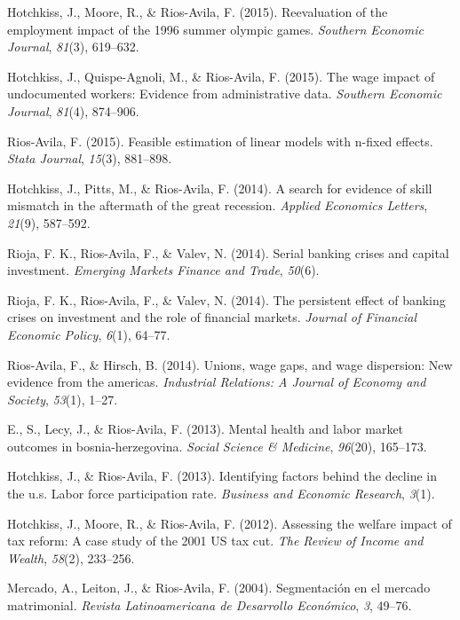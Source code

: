 \documentclass[
  letterpaper,
]{moderncv}
\newlength{\cslhangindent}
\newenvironment{CSLReferences}[2] %
 {\begin{list}{}{%
  \setlength{\itemindent}{0pt}
  \setlength{\leftmargin}{0pt}
  \setlength{\parsep}{0pt}
  \ifodd #1
   \setlength{\leftmargin}{\cslhangindent}
   \setlength{\itemindent}{-1\cslhangindent}
  \fi
  \setlength{\itemsep}{#2\baselineskip}}}
 {\end{list}}
\begin{document}
\begin{CSLReferences}{1}{0}
Hotchkiss, J., Moore, R., \& Rios-Avila, F. (2015). Reevaluation of the
employment impact of the 1996 summer olympic games. \emph{Southern
Economic Journal}, \emph{81}(3), 619--632.

Hotchkiss, J., Quispe-Agnoli, M., \& Rios-Avila, F. (2015). The wage
impact of undocumented workers: Evidence from administrative data.
\emph{Southern Economic Journal}, \emph{81}(4), 874--906.

Rios-Avila, F. (2015). Feasible estimation of linear models with n-fixed
effects. \emph{Stata Journal}, \emph{15}(3), 881--898.

Hotchkiss, J., Pitts, M., \& Rios-Avila, F. (2014). A search for
evidence of skill mismatch in the aftermath of the great recession.
\emph{Applied Economics Letters}, \emph{21}(9), 587--592.

Rioja, F. K., Rios-Avila, F., \& Valev, N. (2014). Serial banking crises
and capital investment. \emph{Emerging Markets Finance and Trade},
\emph{50}(6).

Rioja, F. K., Rios-Avila, F., \& Valev, N. (2014). The persistent effect
of banking crises on investment and the role of financial markets.
\emph{Journal of Financial Economic Policy}, \emph{6}(1), 64--77.

Rios-Avila, F., \& Hirsch, B. (2014). Unions, wage gaps, and wage
dispersion: New evidence from the americas. \emph{Industrial Relations:
A Journal of Economy and Society}, \emph{53}(1), 1--27.

E., S., Lecy, J., \& Rios-Avila, F. (2013). Mental health and labor
market outcomes in bosnia-herzegovina. \emph{Social Science \&
Medicine}, \emph{96}(20), 165--173.

Hotchkiss, J., \& Rios-Avila, F. (2013). Identifying factors behind the
decline in the u.s. Labor force participation rate. \emph{Business and
Economic Research}, \emph{3}(1).

Hotchkiss, J., Moore, R., \& Rios-Avila, F. (2012). Assessing the
welfare impact of tax reform: A case study of the 2001 US tax cut.
\emph{The Review of Income and Wealth}, \emph{58}(2), 233--256.

Mercado, A., Leiton, J., \& Rios-Avila, F. (2004). Segmentaci{ó}n en el
mercado matrimonial. \emph{Revista Latinoamericana de Desarrollo
Econ{ó}mico}, \emph{3}, 49--76.

\end{CSLReferences}
\end{document}
